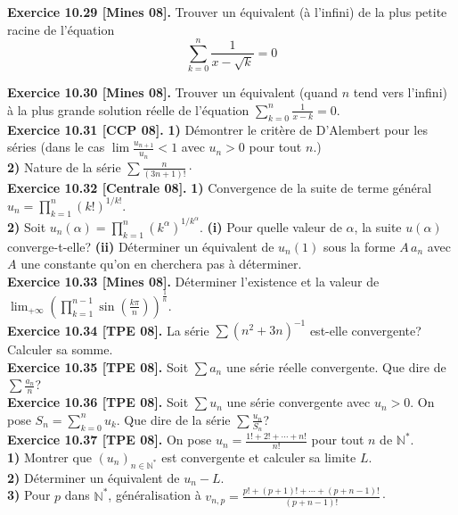 \documentclass[a4paper,12pt,francais]{article}
\newcommand{\field}[1]{\mathbb{#1}}
\newcommand{\N}{\field{N}}
\begin{document}
\noindent
{\bf Exercice 10.29 [Mines 08].} Trouver un équivalent (à l'infini) de la plus petite racine de l'équation 
$$\sum_{k=0}^n \frac{1}{x-\sqrt{k}} =0$$

\noindent
{\bf Exercice 10.30 [Mines 08].} Trouver un équivalent (quand $n$ tend vers l'infini) à la plus grande solution réelle de l'équation 
$\displaystyle \sum_{k=0}^n \frac{1}{x-k}=0.$\\


\noindent
{\bf Exercice 10.31 [CCP 08].} {\bf 1)} Démontrer le critère de D'Alembert pour les séries (dans le cas $\lim \frac{u_{n+1}}{u_n}<1$ avec $u_n>0$ pour tout $n$.)\\
{\bf 2)} Nature de la série $\displaystyle \sum \frac{n}{(3n+1)!} \cdot$\\


\noindent
{\bf Exercice 10.32 [Centrale 08].} {\bf 1)} Convergence de la suite de terme général $\displaystyle u_n=\prod_{k=1}^n (k!)^{1/k!}$.\\
{\bf 2)} Soit $\displaystyle u_n(\alpha)= \prod_{k=1}^n (k^\alpha)^{1/k^\alpha}.$
{\bf (i)} Pour quelle valeur de $\alpha$, la suite $u(\alpha)$ converge-t-elle? 
{\bf (ii)} Déterminer un équivalent de $u_n(1)$ sous la forme $A\, a_n$ avec $A$ une constante qu'on en cherchera pas à déterminer.\\

\noindent
{\bf Exercice 10.33 [Mines 08].} Déterminer l'existence et la valeur de $\displaystyle \lim_{+\infty} 
\left( 
\prod_{k=1}^{n-1} \sin \left( \frac{k \pi}{n} \right) \right)^{\frac{1}{n}}.$ \\

\noindent
{\bf Exercice 10.34 [TPE 08].} La série $\sum (n^2+3n)^{-1}$ est-elle convergente? Calculer sa somme.\\

\noindent
{\bf Exercice 10.35 [TPE 08].} Soit $\sum a_n$ une série réelle convergente. Que dire de $\sum \frac{a_n}{n}$?\\

\noindent
{\bf Exercice 10.36 [TPE 08].} Soit $\sum u_n$ une série convergente avec $u_n>0$. On pose $S_n=\displaystyle \sum_{k=0}^n u_k$. Que dire de la série $\sum \frac{u_n}{S_n}$?\\

\noindent
{\bf Exercice 10.37 [TPE 08].} On pose $\displaystyle u_n=\frac{1!+2!+\cdots +n!}{n!}$ pour tout $n$ de $\N^*$.\\
{\bf 1)} Montrer que $(u_n)_{n\in \N^*}$ est convergente et calculer sa limite $L$.\\
{\bf 2)} Déterminer un équivalent de $u_n-L$.\\
{\bf 3)} Pour $p$ dans $\N^*$, généralisation à $\displaystyle v_{n,p}=\frac{p!+(p+1)!+\cdots +(p+n-1)!}{(p+n-1)!} \cdot$\\
\end{document}
